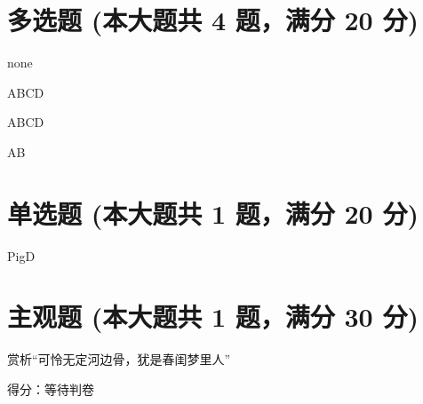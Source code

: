 \documentclass[12pt, a4paper, addpoints, answers]{exam}
\begin{document}
\hspace{5cm}

\section{\normalsize{多选题 (本大题共 4 题，满分 20 分)}}
\hspace{1.5cm}

\begin{questions}
\question[5] none

\begin{oneparcheckboxes}
\end{oneparcheckboxes}

\question[5] ABCD

\begin{oneparcheckboxes}
\end{oneparcheckboxes}

\question[5] ABCD

\begin{oneparcheckboxes}
\end{oneparcheckboxes}

\question[5] AB

\begin{oneparcheckboxes}
\end{oneparcheckboxes}

\end{questions}

\hspace{5cm}

\section{\normalsize{单选题 (本大题共 1 题，满分 20 分)}}
\hspace{1.5cm}

\begin{questions}
\question[20] PigD

\begin{oneparchoices}
\end{oneparchoices}

\answerline

\end{questions}

\hspace{5cm}

\section{\normalsize{主观题 (本大题共 1 题，满分 30 分)}}
\hspace{1.5cm}

\begin{questions}
\question[30] 赏析“可怜无定河边骨，犹是春闺梦里人”


得分：等待判卷   

\end{questions}
\end{document}
